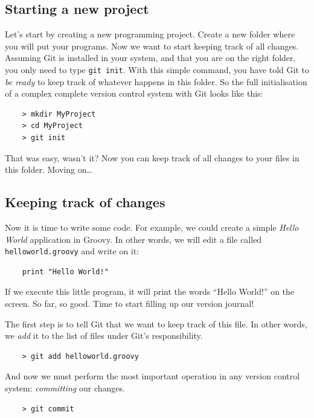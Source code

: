 \subsection{Starting a new project}
\label{sec:starting-new-project}

Let's start by creating a new programming project. Create a new folder
where you will put your programs. Now we want to start keeping track
of all changes. Assuming Git is installed in your system, and that you
are on the right folder, you only need to type \verb+git init+. With
this simple command, you have told Git to \emph{be ready} to keep 
track of whatever happens in this folder. So the full initialisation
of a complex complete version control system with Git looks like this: 

\begin{verbatim}
    > mkdir MyProject
    > cd MyProject
    > git init
\end{verbatim}

That was easy, wasn't it? Now you can keep track of all changes to
your files in this folder. Moving on\ldots

\subsection{Keeping track of changes}
\label{sec:keep-track-chang}

Now it is time to write some code. For example, we could create a
simple \emph{Hello World} application in Groovy. In other words, we
will edit a file called \verb+helloworld.groovy+ and write on it:

\begin{verbatim}
    print "Hello World!"
\end{verbatim}

If we execute this little program, it will print the words ``Hello
World!'' on the screen. So far, so good. Time to start filling up our
version journal! 

The first step is to tell Git that we want to keep track of this
file. In other words, we \emph{add} it to the list of files under
Git's responsibility. 

\begin{verbatim}
    > git add helloworld.groovy
\end{verbatim}

And now we must perform the most important operation in any version control
system: \emph{committing} our changes. 

\begin{verbatim}
    > git commit
\end{verbatim}

